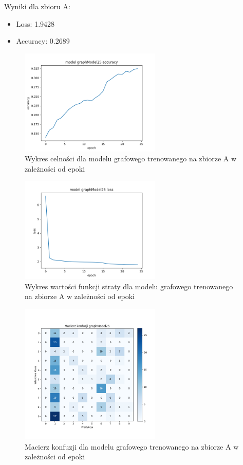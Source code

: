 \documentclass{article}
\begin{document}
Wyniki dla zbioru A:
\begin{itemize}
    \item Loss: 1.9428
    \item Accuracy: 0.2689
\end{itemize}

\begin{figure}[H]
    \centering
    \includegraphics[width=0.6\textwidth]{../Saves/Graph/graphModel25_acc.png}
    \caption{Wykres celności dla modelu grafowego trenowanego na zbiorze A w zależności od epoki}
\end{figure}

\begin{figure}[H]
    \centering
    \includegraphics[width=0.6\textwidth]{../Saves/Graph/graphModel25_loss.png}
    \caption{Wykres wartości funkcji straty dla modelu grafowego trenowanego na zbiorze A w zależności od epoki} 
\end{figure}

\begin{figure}[H]
    \centering
    \includegraphics[width=0.6\textwidth]{../Saves/Graph/graphModel25_confusion.png}
    \caption{Macierz konfuzji dla modelu grafowego trenowanego na zbiorze A w zależności od epoki} 
\end{figure}
\end{document}
